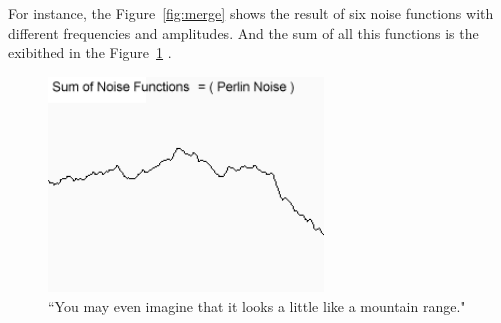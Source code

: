 For instance, the Figure~\ref{fig:merge} shows the result of six noise functions with different frequencies and amplitudes. And the sum of all this functions is the exibithed in the Figure~\ref{fig:noise} \cite{NoisesELIAS}.



\begin{figure}[htbp]
	\centering
	\includegraphics[width=0.65\textwidth]{img/Theory/Perlin_Noise/perlin1.png}
	\caption{``You may even imagine that it looks a little like a mountain range."}
	\label{fig:noise}
\end{figure}




